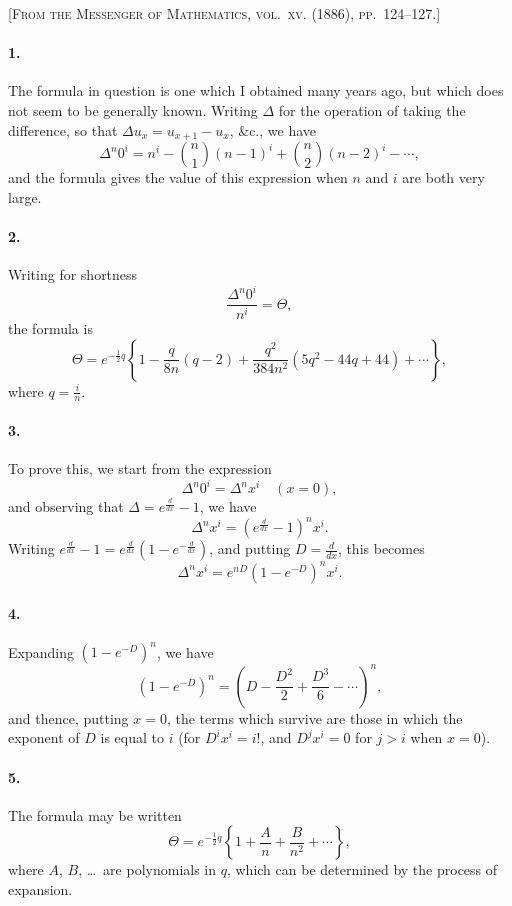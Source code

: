 \documentclass[11pt,a4paper]{article}
\theoremstyle{definition}
\begin{document}
\noindent\textsc{[From the Messenger of Mathematics, vol.~xv. (1886), pp.~124--127.]}

\smallskip

\paragraph{1.} The formula in question is one which I obtained many years ago, but which does not seem to be generally known. Writing $\Delta$ for the operation of taking the difference, so that $\Delta u_{x} = u_{x+1} - u_{x}$, \&c., we have
\[
\Delta^{n} 0^{i} = n^{i} - \binom{n}{1}(n-1)^{i} + \binom{n}{2}(n-2)^{i} - \cdots,
\]
and the formula gives the value of this expression when $n$ and $i$ are both very large.

\paragraph{2.} Writing for shortness
\[
\frac{\Delta^{n} 0^{i}}{n^{i}} = \Theta,
\]
the formula is
\[
\Theta = e^{-\frac{1}{2}q}\left\{1 - \frac{q}{8n}(q - 2) + \frac{q^{2}}{384n^{2}}(5q^{2} - 44q + 44) + \cdots\right\},
\]
where $q = \frac{i}{n}$.

\paragraph{3.} To prove this, we start from the expression
\[
\Delta^{n} 0^{i} = \Delta^{n} x^{i} \quad (x = 0),
\]
and observing that $\Delta = e^{\frac{d}{dx}} - 1$, we have
\[
\Delta^{n} x^{i} = (e^{\frac{d}{dx}} - 1)^{n} x^{i}.
\]
Writing $e^{\frac{d}{dx}} - 1 = e^{\frac{d}{dx}}(1 - e^{-\frac{d}{dx}})$, and putting $D = \frac{d}{dx}$, this becomes
\[
\Delta^{n} x^{i} = e^{nD}(1 - e^{-D})^{n} x^{i}.
\]

\paragraph{4.} Expanding $(1 - e^{-D})^{n}$, we have
\[
(1 - e^{-D})^{n} = \left(D - \frac{D^{2}}{2} + \frac{D^{3}}{6} - \cdots\right)^{n},
\]
and thence, putting $x = 0$, the terms which survive are those in which the exponent of $D$ is equal to $i$ (for $D^{i}x^{i} = i!$, and $D^{j}x^{i} = 0$ for $j > i$ when $x = 0$).

\paragraph{5.} The formula may be written
\[
\Theta = e^{-\frac{1}{2}q}\left\{1 + \frac{A}{n} + \frac{B}{n^{2}} + \cdots\right\},
\]
where $A$, $B$, \ldots\ are polynomials in $q$, which can be determined by the process of expansion.
\end{document}
